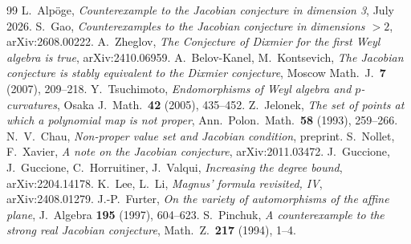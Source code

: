 \documentclass[12pt,a4paper]{article}
\theoremstyle{definition}
\begin{document}
\begin{thebibliography}{99}
 L.~Alp\"oge, \emph{Counterexample to the Jacobian conjecture in
dimension 3}, July 2026.
 S.~Gao, \emph{Counterexamples to the Jacobian conjecture in dimensions
$> 2$}, arXiv:2608.00222.
 A.~Zheglov, \emph{The Conjecture of Dixmier for the first Weyl
algebra is true}, arXiv:2410.06959.
 A.~Belov-Kanel, M.~Kontsevich, \emph{The Jacobian conjecture is stably
equivalent to the Dixmier conjecture}, Moscow Math.\ J.\ \textbf{7} (2007), 209--218.
 Y.~Tsuchimoto, \emph{Endomorphisms of Weyl algebra and
$p$-curvatures}, Osaka J.\ Math.\ \textbf{42} (2005), 435--452.
 Z.~Jelonek, \emph{The set of points at which a polynomial map is
not proper}, Ann.\ Polon.\ Math.\ \textbf{58} (1993), 259--266.
 N.~V.~Chau, \emph{Non-proper value set and Jacobian condition},
preprint.
 S.~Nollet, F.~Xavier, \emph{A note on the Jacobian conjecture},
arXiv:2011.03472.
 J.~Guccione, J.~Guccione, C.~Horruitiner, J.~Valqui, \emph{Increasing
the degree bound}, arXiv:2204.14178.
 K.~Lee, L.~Li, \emph{Magnus' formula revisited, IV},
arXiv:2408.01279.
 J.-P.~Furter, \emph{On the variety of automorphisms of the affine
plane}, J.\ Algebra \textbf{195} (1997), 604--623.
 S.~Pinchuk, \emph{A counterexample to the strong real Jacobian
conjecture}, Math.\ Z.\ \textbf{217} (1994), 1--4.
\end{thebibliography}
\end{document}

